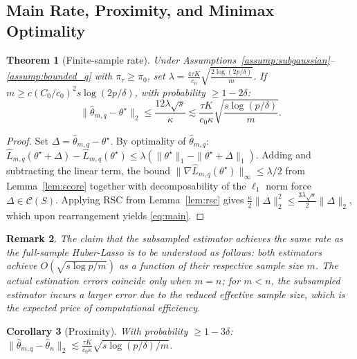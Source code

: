 \documentclass[10pt]{article}
\newtheorem{theorem}{Theorem}[section]
\newtheorem{corollary}[theorem]{Corollary}
\newtheorem{remark}[theorem]{Remark}
\newcommand{\hL}{\hat{L}}
\newcommand{\hth}{\hat{\theta}}
\newcommand{\ts}{\theta^{\star}}
\begin{document}
\subsection{Main Rate, Proximity, and Minimax Optimality}

\begin{theorem}[Finite-sample rate]\label{thm:main_rate}
Under Assumptions~\ref{assump:subgaussian}--\ref{assump:bounded_q}
with $\pi_\tau\ge\pi_0$, set
$\lambda=\frac{4\tau K}{c_0}\sqrt{\frac{2\log(2p/\delta)}{m}}$.
If $m\ge c(C_0/c_0)^2s\log(2p/\delta)$, with probability $\ge1-2\delta$:
\begin{equation}\label{eq:main}
  \|\hth_{m,q}-\ts\|_2
  \le\frac{12\lambda\sqrt{s}}{\kappa}
  \lesssim\frac{\tau K}{c_0\kappa}\sqrt{\frac{s\log(p/\delta)}{m}}.
\end{equation}
\end{theorem}
\begin{proof}
Set $\Delta=\hth_{m,q}-\ts$. By optimality of $\hth_{m,q}$:
$\hL_{m,q}(\ts+\Delta)-\hL_{m,q}(\ts)\le\lambda(\|\ts\|_1-\|\ts+\Delta\|_1)$.
Adding and subtracting the linear term, the bound
$\|\nabla\hL_{m,q}(\ts)\|_\infty\le\lambda/2$ from Lemma~\ref{lem:score}
together with decomposability of the $\ell_1$ norm force $\Delta\in\mathcal{C}(S)$.
Applying RSC from Lemma~\ref{lem:rsc} gives
$\frac{\kappa}{2}\|\Delta\|_2^2\le\frac{3\lambda\sqrt{s}}{2}\|\Delta\|_2$,
which upon rearrangement yields \eqref{eq:main}.
\end{proof}

\begin{remark}\label{rem:rate}
The claim that the subsampled estimator achieves the same rate as the
full-sample Huber-Lasso is to be understood as follows: both estimators achieve
$O(\sqrt{s\log p/m})$ as a function of their respective sample size $m$.
The actual estimation errors coincide only when $m=n$; for $m<n$, the
subsampled estimator incurs a larger error due to the reduced effective sample
size, which is the expected price of computational efficiency.
\end{remark}

\begin{corollary}[Proximity]\label{cor:prox}
With probability $\ge1-3\delta$:
$\|\hth_{m,q}-\hth_n\|_2\lesssim
\frac{\tau K}{c_0\kappa}\sqrt{s\log(p/\delta)/m}$.
\end{corollary}
\end{document}
